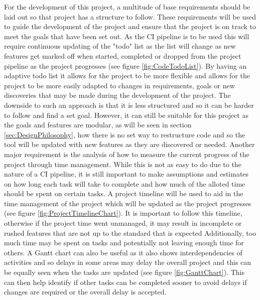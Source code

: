 For the development of this project, a multitude of base requirements should be laid out so that project has a structure to follow. These requirements will be used to guide the development of the project and ensure that the project is on track to meet the goals that have been set out.
As the CI pipeline is to be used this will require continuous updating of the "todo" list as the list will change as new features get marked off when started, completed or dropped from the project pipeline as the project progresses (see figure \ref{fig:CodeTodoList}). By having an adaptive todo list it allows for the project to be more flexible and allows for the project to be more easily adapted to changes in requirements, goals or new discoveries that may be made during the development of the project. The downside to such an approach is that it is less structured and so it can be harder to follow and find a set goal. However, it can still be suitable for this project as the goals and features are modular, as will be seen in section \ref{sec:DesignPhilosophy}, how there is no set way to restructure code and so the tool will be updated with new features as they are discovered or needed.
Another major requirement is the analysis of how to measure the current progress of the project through time management. While this is not as easy to do due to the nature of a CI pipeline, it is still important to make assumptions and estimates on how long each task will take to complete and how much of the alloted time should be spent on certain tasks. A project timeline will be used to aid in the time management of the project which will be updated as the project progresses (see figure \ref{fig:ProjectTimelineChart}). It is important to follow this timeline, otherwise if the project time went unmanaged, it may result in incomplete or rushed features that are not up to the standard that is expected Additionally, too much time may be spent on tasks and potentially not leaving enough time for others. A Gantt chart can also be useful as it also shows interdependencies of activities and so delays in some areas may delay the overall project and this can be equally seen when the tasks are updated (see figure \ref{fig:GanttChart}). This can then help identify if other tasks can be completed sooner to avoid delays if changes are required or the overall delay is accepted.

